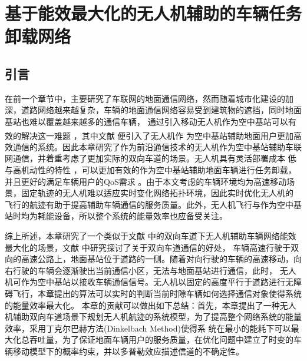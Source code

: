 \chapter{基于能效最大化的无人机辅助的车辆任务卸载网络}

\label{chap:table第四章}
\section{引言}\label{section4-1}
\label{chap:introduction第四章}
在前一个章节中，主要研究了车联网的地面通信网络，然而随着城市化建设的加深，道路网络越来越复杂，车辆的地面通信网络容易受到建筑物的遮挡，同时地面基站也难以覆盖越来越多的通信车辆，
通过引入移动无人机作为空中基站可以有效的解决这一难题  \textsuperscript{\cite{Effect2020,Performance2022}}，其中文献 \cite{WirelessRelay5937283} 便引入了无人机作
为空中基站辅助地面用户更加高效通信的系统。因此本章研究了作为前沿通信技术的无人机作为空中基站辅助车联网通信，并着重考虑了更加实际的双向车道的场景。无人机具有灵活部署成本
低与高机动性的特性  \supercite{无人机技术辅助的车联网,王智煊2023无人机辅助下的车联边缘计算卸载机制研究,Joint9453853}，可以更加有效的作为空中基站辅助地面车辆进行任务卸载，
并且更好的满足车辆用户的QoS需求 \supercite{无人机QoS9373692}。由于本文考虑的车辆环境均为高速移动场景，固定轨迹的无人机难以适应实时变化网络拓扑环境，因此实时优化无人机的
飞行的航迹有助于提高辅助车辆通信的服务质量。此外，无人机飞行与作为空中基站时均为耗能设备，所以整个系统的能量效率也应备受关注。

综上所述，本章研究了一个类似于文献 \cite{twoway7091030}中的双向车道下无人机辅助车辆网络能效最大化的场景，文献 \cite{twoway5753961,twoway575396233,Spatial4490168,Stochastic6576809}中研究探讨了关于双向车道通信的好处，
车辆高速行驶于双向的高速公路上，地面基站位于道路的一侧。随着对向行驶的车辆的高速移动，向右行驶的车辆会逐渐驶出当前通信小区，无法与地面基站进行通信，此时，
无人机可作为空中基站以接收车辆通信信号。无人机以固定的高度平行于道路进行无障碍飞行，本章提出的算法可以实时的判断当前时隙车辆如何选择通信对象使得系统的能量效率最大化。
本章的贡献可以做出如下总结：首先，本章提出了一种无人机辅助双向车道场景下规划无人机航迹的系统模型，为了提高整个网络系统的能量效率，采用丁克尔巴赫方法(Dinkelbach Method)使得系
统在最小的能耗下可以最大化总吞吐量，为了保证地面车辆用户的服务质量，在优化问题中建立了时变的车辆移动模型下的概率约束，并以多普勒效应描述信道的不确定性。
